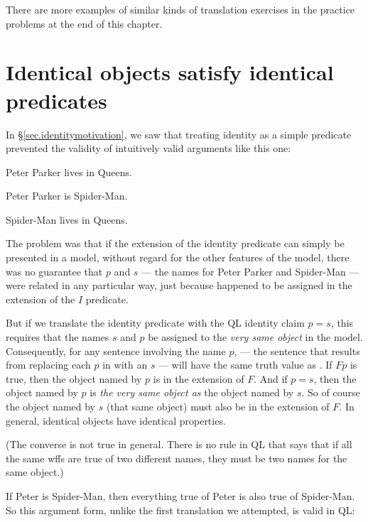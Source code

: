 There are more examples of similar kinds of translation exercises in the practice problems at the end of this chapter.

\section{Identical objects satisfy identical predicates}

In \S\ref{sec.identitymotivation}, we saw that treating identity as a simple predicate prevented the validity of intuitively valid arguments like  this one:

\begin{earg}
\item[\ref{ppq}] Peter Parker lives in Queens.
\item[\ref{pps}] Peter Parker is Spider-Man.
\item[\ref{sq}] Spider-Man lives in Queens.
\end{earg}

The problem was that if the extension of the identity predicate can simply be presented in a model, without regard for the other features of the model, there was no guarantee that $p$ and $s$ --- the names for Peter Parker and Spider-Man --- were related in any particular way, just because  happened to be assigned in the extension of the $I$ predicate.

But if we translate the identity predicate with the QL identity claim $p{=}s$, this requires that the names $s$ and $p$ be assigned to the \emph{very same object} in the model. Consequently, for any sentence \metaA{} involving the name $p$, \metaA{} --- the sentence that results from replacing each $p$ in \metaA{} with an $s$ --- will have the same truth value as \metaA{}. If $Fp$ is true, then the object named by $p$ is in the extension of $F$. And if $p{=}s$, then the object named by $p$ is \emph{the very same object as} the object named by $s$. So of course the object named by $s$ (that same object) must also be in the extension of $F$. In general, identical objects have identical properties.

(The converse is not true in general. There is no rule in QL that says that if all the same wffs are true of two different names, they must be two names for the same object.)

If Peter is Spider-Man, then everything true of Peter is also true of Spider-Man. So this argument form, unlike the first translation we attempted, is valid in QL:


